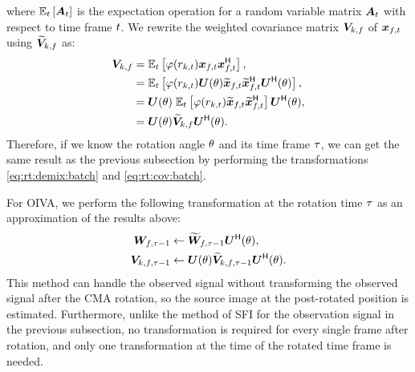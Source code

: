 \documentclass[sip,biber]{now-journal}
\newcommand{\todo}[1]{\textcolor{red}{#1}}
\begin{document}
where $\mathbb{E} _{t}\left[\bm{A} _{t}\right]$ is the expectation operation for a random variable matrix $\bm{A}_{t}$ with respect to time frame $t$.
We rewrite the weighted covariance matrix ${\bm{V}} _{k,f}$ of $\Obs _{\ft}$ using $\widetilde{\bm{V}} _{k,f}$ as:
\begin{align}
  \cov _{\src,\freq} &= \expct  _{\tframe} \left[\weight (\var _{\src,\tframe}) \Obs _{\ft} \Obs _{\ft} ^{\hermite}\right], \\
                     &= \expct  _{\tframe} \left[\weight (\var _{\src,\tframe}) \rotMat (\rotSpat) \refpos{\Obs} _{\ft} \refpos{\Obs} _{\ft} ^{\hermite} \rotMat ^{\hermite} (\rotSpat)\right], \\
                     &= \rotMat (\rotSpat)\; \expct  _{\tframe} \left[\weight (\var _{\src,\tframe}) \refpos{\Obs} _{\ft} \refpos{\Obs} _{\ft} ^{\hermite} \right] \rotMat ^{\hermite} (\rotSpat), \\
                     &= \rotMat (\rotSpat) \refpos{\cov} _{\src,\freq} \rotMat ^{\hermite} (\rotSpat). \label{eq:rt:cov:batch}
\end{align}
Therefore, if we know the rotation angle $\theta$ and its time frame $\tau$, we can get the same result as the previous subsection by performing the transformations \eqref{eq:rt:demix:batch} and \eqref{eq:rt:cov:batch}.

For OIVA, we perform the following transformation at the rotation time $\tau$ as an approximation of the results above:
\begin{align}
  \bm{W} _{f,\tau - 1} &\gets \widetilde{\bm{W}} _{f,\tau - 1} \bm{U} ^{\mathsf{H}} (\theta), \\
  \bm{V} _{k,f,\tau - 1} &\gets \bm{U} (\theta) \widetilde{\bm{V}} _{k,f,\tau - 1} \bm{U} ^{\mathsf{H}} (\theta).
\end{align}
This method can handle the observed signal without transforming the observed signal after the CMA rotation, so the source image at the post-rotated position is estimated.
Furthermore, unlike the method of SFI for the observation signal in the previous subsection, no transformation is required for every single frame after rotation, and only one transformation at the time of the rotated time frame is needed.
\todo{%
}
\end{document}

